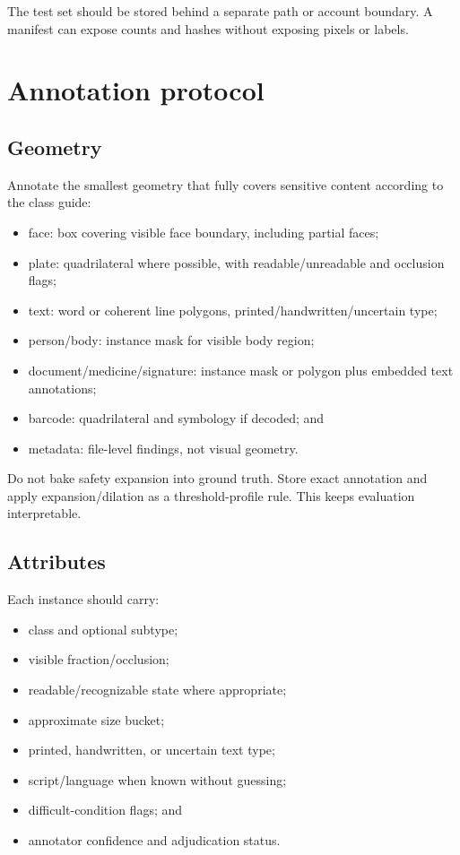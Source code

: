 The test set should be stored behind a separate path or account boundary. A manifest can expose counts and hashes without exposing pixels or labels.

\section{Annotation protocol}

\subsection{Geometry}

Annotate the smallest geometry that fully covers sensitive content according to the class guide:

\begin{itemize}[leftmargin=6mm]
  \item face: box covering visible face boundary, including partial faces;
  \item plate: quadrilateral where possible, with readable/unreadable and occlusion flags;
  \item text: word or coherent line polygons, printed/handwritten/uncertain type;
  \item person/body: instance mask for visible body region;
  \item document/medicine/signature: instance mask or polygon plus embedded text annotations;
  \item barcode: quadrilateral and symbology if decoded; and
  \item metadata: file-level findings, not visual geometry.
\end{itemize}

Do not bake safety expansion into ground truth. Store exact annotation and apply expansion/dilation as a threshold-profile rule. This keeps evaluation interpretable.

\subsection{Attributes}

Each instance should carry:

\begin{itemize}[leftmargin=6mm]
  \item class and optional subtype;
  \item visible fraction/occlusion;
  \item readable/recognizable state where appropriate;
  \item approximate size bucket;
  \item printed, handwritten, or uncertain text type;
  \item script/language when known without guessing;
  \item difficult-condition flags; and
  \item annotator confidence and adjudication status.
\end{itemize}

